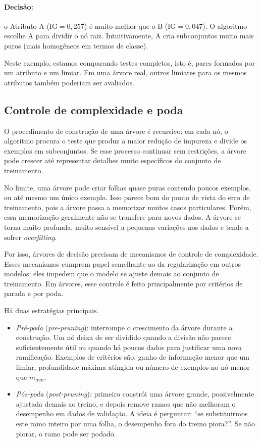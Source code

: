 \documentclass[12pt,a4paper]{article}
\begin{document}
\paragraph{Decisão:} o Atributo A ($\text{IG} = 0{,}257$) é muito melhor que o B ($\text{IG} = 0{,}047$). O algoritmo escolhe A para dividir o nó raiz. Intuitivamente, A cria subconjuntos muito mais puros (mais homogêneos em termos de classe).

Neste exemplo, estamos comparando testes completos, isto é, pares formados por um atributo e um limiar. Em uma árvore real, outros limiares para os mesmos atributos também poderiam ser avaliados.

\subsection{Controle de complexidade e poda}
\label{subsec:poda}

O procedimento de construção de uma árvore é recursivo: em cada nó, o algoritmo procura o teste que produz a maior redução de impureza e divide os exemplos em subconjuntos. Se esse processo continuar sem restrições, a árvore pode crescer até representar detalhes muito específicos do conjunto de treinamento.

No limite, uma árvore pode criar folhas quase puras contendo poucos exemplos, ou até mesmo um único exemplo. Isso parece bom do ponto de vista do erro de treinamento, pois a árvore passa a memorizar muitos casos particulares. Porém, essa memorização geralmente não se transfere para novos dados. A árvore se torna muito profunda, muito sensível a pequenas variações nos dados e tende a sofrer
\emph{overfitting}.

Por isso, árvores de decisão precisam de mecanismos de controle de complexidade. Esses mecanismos cumprem papel semelhante ao da regularização em outros modelos: eles impedem que o modelo se ajuste demais ao conjunto de treinamento. Em árvores, esse controle é feito principalmente por critérios de parada e por poda.

Há duas estratégias principais.

\begin{itemize}
    \item \emph{Pré-poda} (\textit{pre-pruning}): interrompe o crescimento da árvore durante a construção. Um nó deixa de ser dividido quando a divisão não parece suficientemente útil ou quando há poucos dados para justificar uma nova ramificação. Exemplos de critérios são: ganho de informação menor que um limiar, profundidade máxima atingida ou número de exemplos no nó
    menor que $m_{\min}$.

    \item \emph{Pós-poda} (\textit{post-pruning}): primeiro constrói uma árvore grande, possivelmente ajustada demais ao treino, e depois remove ramos que não melhoram o desempenho em dados de validação. A ideia é perguntar: ``se substituirmos este ramo inteiro por uma folha, o desempenho fora do treino piora?''. Se não piorar, o ramo pode ser podado.
\end{itemize}
\end{document}
